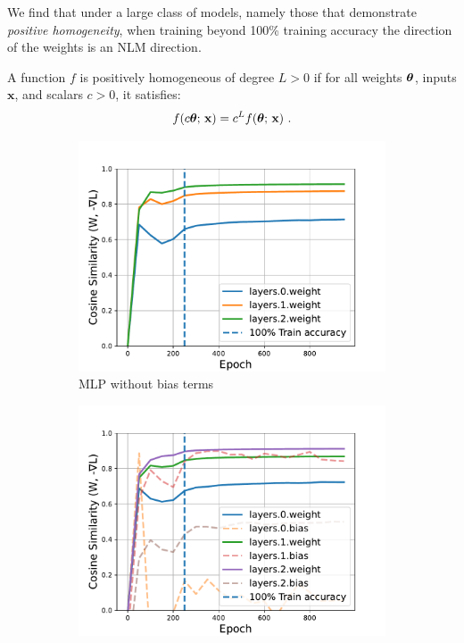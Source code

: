 We find that under a large class of models, namely those that demonstrate \textit{positive homogeneity}, when training beyond 100\% training accuracy the direction of the weights is an NLM direction.
\begin{dfn}
    A function $f$ is positively homogeneous of degree $L > 0$ if for all weights $\boldsymbol{\theta}$, inputs $\mathbf{x}$, and scalars $c > 0$, it satisfies:
\begin{equation}\label{eq:homogeneous}
f(c\boldsymbol{\theta};\, \mathbf{x}) = c^{L} f(\boldsymbol{\theta};\, \mathbf{x}) ~ .
\end{equation}

\begin{figure}[t]
\begin{subfigure}[t]{.33\textwidth}
    \includegraphics[width=\linewidth]{grokking_iclr_arxiv/figures/nlm_no_bias_mlp.pdf}
    \caption{\vspace{-1mm}MLP without bias terms}
    \label{fig:nmm_no_bias}
\end{subfigure}%
\begin{subfigure}[t]{.33\textwidth}
    \includegraphics[width=\linewidth]{grokking_iclr_arxiv/figures/nlm_bias_mlp.pdf}

\end{subfigure}
\end{figure}
\end{dfn}
